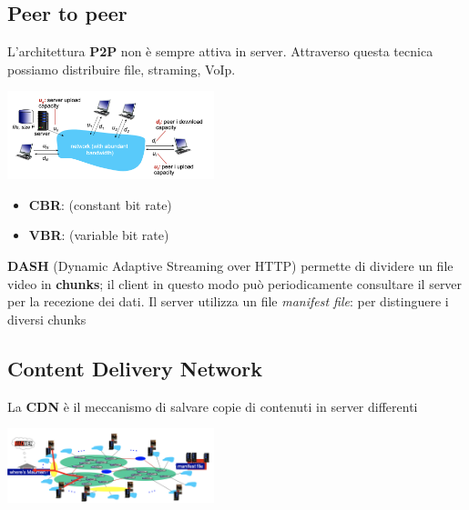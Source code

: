 \documentclass{article}
\begin{document}
\subsection{Peer to peer}
L'architettura \textbf{P2P} non è sempre attiva in server. Attraverso questa tecnica possiamo distribuire file, straming, VoIp. 
\begin{center}
  \includegraphics[width=6cm]{img/p2p.png}
\end{center}
\begin{itemize}
  \item \textbf{CBR}: (constant bit rate)
  \item \textbf{VBR}: (variable bit rate)
\end{itemize}
\textbf{DASH} (Dynamic Adaptive Streaming over HTTP) permette di dividere un file video in \textbf{chunks}; il client in questo modo può periodicamente consultare il server per la recezione dei dati.
Il server utilizza un file \textit{manifest file}: per distinguere i diversi chunks

\subsection{Content Delivery Network}
La \textbf{CDN} è il meccanismo di salvare copie di contenuti in server differenti
\begin{center}
  \includegraphics[width=6cm]{img/CDN.png}
\end{center}
\end{document}
